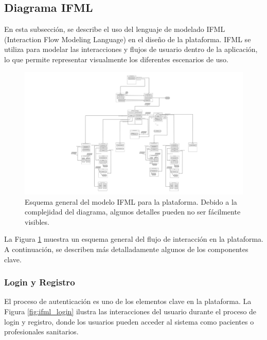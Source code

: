 \documentclass{article}
\begin{document}
\newpage
\subsection{Diagrama IFML}


En esta subsección, se describe el uso del lenguaje de modelado IFML (Interaction Flow Modeling Language) en el diseño de la plataforma. IFML se utiliza para modelar las interacciones y flujos de usuario dentro de la aplicación, lo que permite representar visualmente los diferentes escenarios de uso.

\begin{figure}[H]
	\centering
	\includegraphics[width=\textwidth]{images/ifml_general.png}
	\caption{Esquema general del modelo IFML para la plataforma. Debido a la complejidad del diagrama, algunos detalles pueden no ser fácilmente visibles.}
	\label{fig:ifml_general}
\end{figure}

La Figura \ref{fig:ifml_general} muestra un esquema general del flujo de interacción en la plataforma. A continuación, se describen más detalladamente algunos de los componentes clave.
\newpage
\subsubsection{Login y Registro}

El proceso de autenticación es uno de los elementos clave en la plataforma. La Figura \ref{fig:ifml_login} ilustra las interacciones del usuario durante el proceso de login y registro, donde los usuarios pueden acceder al sistema como pacientes o profesionales sanitarios.
\end{document}
